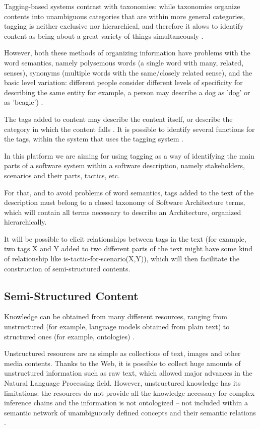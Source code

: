 \documentclass{llncs}
\begin{document}
Tagging-based systems contrast with taxonomies: while taxonomies organize contents into unambiguous categories that are within more general categories, tagging is neither exclusive nor hierarchical, and therefore it alows to identify content as being about a great variety of things simultaneously \cite{golder2006usage}. 

However, both these methods of organizing information have problems with the word semantics, namely polysemous words (a single word with many, related, senses), synonyms (multiple words with the same/closely related sense), and the basic level variation: different people consider different levels of specificity for describing the same entity for example, a person may describe a dog as 'dog' or as 'beagle') \cite{tanaka1991object}. 

The tags added to content may describe the content itself, or describe the category in which the content falls \cite{coates2005two}. It is possible to identify several functions for the tags, within the system that uses the tagging system \cite{golder2006usage}.

In this platform we are aiming for using tagging as a way of identifying the main parts of a software system within a software description, namely stakeholders, scenarios and their parts, tactics, etc. 

For that, and to avoid problems of word semantics, tags added to the text of the description must belong to a closed taxonomy of Software Architecture terms, which will contain all terms necessary to describe an Architecture, organized hierarchically. 

It will be possible to elicit relationships between tags in the text (for example, two tags X and Y added to two different parts of the text might have some kind of relationship like is-tactic-for-scenario(X,Y)), which will then facilitate the construction of semi-structured contents.


\subsection{Semi-Structured Content}
Knowledge can be obtained from many different resources, ranging from unstructured (for example, language models obtained from plain text) to structured ones (for example, ontologies) \cite{hovy2013collaboratively}.

Unstructured resources are as simple as collections of text, images and other media contents. Thanks to the Web, it is possible to collect huge amounts of unstructured information such as raw text, which allowed major advances in the Natural Language Processing field. However, unstructured knowledge has its limitations: the resources do not provide all the knowledge necessary for complex inference chains \cite{domingos2007toward} and the information is not ontologized – not included within a semantic network of unambiguously defined concepts and their semantic relations \cite{hovy2013collaboratively}.
\end{document}
